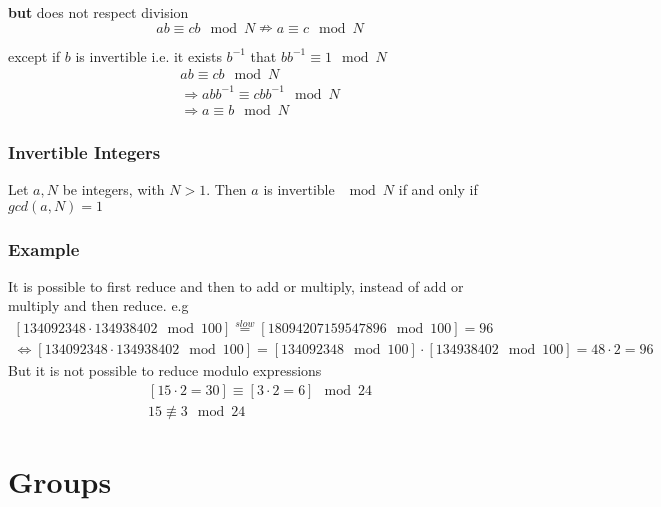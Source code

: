 \documentclass[a4paper]{article}
\begin{document}
\textbf{but} does not respect division
\begin{equation}
    ab \equiv cb \mod N \nRightarrow a \equiv c \mod N 
    \label{modulo_arithmetic_division}
\end{equation}

except if $b$ is invertible i.e. it exists $b^{-1}$ that $bb^{-1} \equiv  1 \mod N$ 
\begin{equation}
    \begin{split}
	ab \equiv cb \mod N \\
	\Rightarrow abb^{-1} \equiv cbb^{-1} \mod N \\
	\Rightarrow a \equiv b \mod N
    \end{split}
    \label{modulo_arithmetic_multiplication_invertible}
\end{equation}

\subsubsection{Invertible Integers}
Let $a,N$ be integers, with $N > 1$. Then $a$ is invertible $\mod N$ if and only if $gcd(a,N) =1$

\subsubsection{Example}
It is possible to first reduce and then to add or multiply, instead of add or multiply and then reduce.
e.g 
\begin{equation*}
    \begin{split}
	[134092348\cdot134938402 \mod 100] \stackrel{slow}{=} [18094207159547896\mod 100] = 96 \\
	\Leftrightarrow[134092348\cdot134938402 \mod 100] = [134092348 \mod 100]\cdot[134938402 \mod 100] = 48\cdot2 = 96 
    \end{split}
\end{equation*}
But it is not possible to reduce modulo expressions
\begin{equation*}
    \begin{split}
	[15 \cdot 2 = 30] \equiv[3 \cdot 2 = 6] \mod 24 \\
	15 \nequiv 3 \mod 24
    \end{split}
\end{equation*}

\section{Groups}
\end{document}
